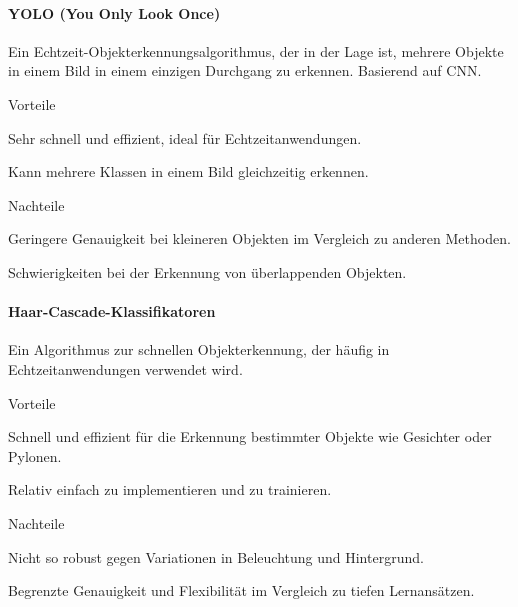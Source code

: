 \documentclass[../main.tex]{subfiles}
\begin{document}
\paragraph{YOLO (You Only Look Once)}

Ein Echtzeit-Objekterkennungsalgorithmus, der in der Lage ist, mehrere Objekte in einem Bild in einem einzigen Durchgang zu erkennen. Basierend auf CNN.

\begin{minipage}[t]{0.48\textwidth}
\begin{items}
  \item [Vorteile]
  \item Sehr schnell und effizient, ideal für Echtzeitanwendungen.
  \item Kann mehrere Klassen in einem Bild gleichzeitig erkennen.
\end{items}
\end{minipage}
\hfill
\begin{minipage}[t]{0.48\textwidth}
\begin{items}
  \item [Nachteile]
  \item Geringere Genauigkeit bei kleineren Objekten im Vergleich zu anderen Methoden.
  \item Schwierigkeiten bei der Erkennung von überlappenden Objekten.
\end{items}
\end{minipage}

\paragraph{Haar-Cascade-Klassifikatoren}

Ein Algorithmus zur schnellen Objekterkennung, der häufig in Echtzeitanwendungen verwendet wird.

\begin{minipage}[t]{0.48\textwidth}
\begin{items}
  \item [Vorteile]
  \item Schnell und effizient für die Erkennung bestimmter Objekte wie Gesichter oder Pylonen.
  \item Relativ einfach zu implementieren und zu trainieren.
\end{items}
\end{minipage}
\hfill
\begin{minipage}[t]{0.48\textwidth}
\begin{items}
  \item [Nachteile]
  \item Nicht so robust gegen Variationen in Beleuchtung und Hintergrund.
  \item Begrenzte Genauigkeit und Flexibilität im Vergleich zu tiefen Lernansätzen.
\end{items}
\end{minipage}
\end{document}
